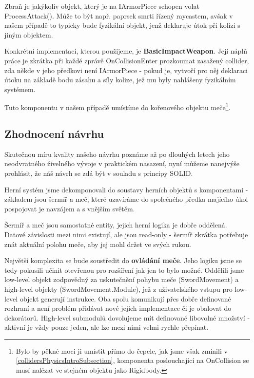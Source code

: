 Zbraň je jakýkoliv objekt, který je na IArmorPiece schopen volat ProcessAttack(). Může to být např. paprsek smrti řízený raycastem, avšak v našem případě to typicky bude fyzikální objekt, jenž deklaruje útok při kolizi s jiným objektem. 

Konkrétní implementací, kterou použijeme, je \textbf{BasicImpactWeapon}. Její náplň práce je zkrátka při každé zprávě OnCollisionEnter prozkoumat zasažený collider, zda někde v jeho předkovi není IArmorPiece - pokud je, vytvoří pro něj deklaraci útoku na základě bodu zásahu a síly kolize, jež mu byly nahlášeny fyzikálním systémem. 

Tuto komponentu v našem případě umístíme do kořenového objektu meče\footnote{Bylo by pěkné moci ji umístit přímo do čepele, jak jsme však zmínili v \ref{collidersPhysicsIntroSubsection}, komponenta poslouchající na OnCollision se musí nalézat ve stejném objektu jako Rigidbody. }.



\subsection{Zhodnocení návrhu} 

Skutečnou míru kvality našeho návrhu poznáme až po dlouhých letech jeho neodvratného živelného vývoje v praktickém nasazení, nyní můžeme nanejvýše prohlásit, že náš návrh se zdá být v souladu s principy SOLID. 

Herní systém jsme dekomponovali do soustavy herních objektů s komponentami - základem jsou šermíř a meč, které uzavíráme do společného předka majícího úkol pospojovat je navzájem a s vnějším světěm. 

Šermíř a meč jsou samostatné entity, jejich herní logika je dobře oddělená. Datové závislosti mezi nimi existují, ale jsou read-only - šermíř zkrátka potřebuje znát aktuální polohu meče, aby jej mohl držet ve svých rukou.

Největší komplexita se bude soustředit do \textbf{ovládání meče}. Jeho logiku jsme se tedy pokusili učinit otevřenou pro rozšíření jak jen to bylo možné. Oddělili jsme low-level objekt zodpovědný za uskutečnění pohybu meče (SwordMovement) a high-level objekty (SwordMovement.Module), jež z uživatelského vstupu pro low-level objekt generují instrukce. Oba spolu komunikují přes dobře definované rozhraní a není problém přidávat nové jejich implementace či je obalovat do dekorátorů. High-level submodulů dovolujeme mít definované libovolné množství - aktivní je vždy pouze jeden, ale lze mezi nimi velmi rychle přepínat. 

